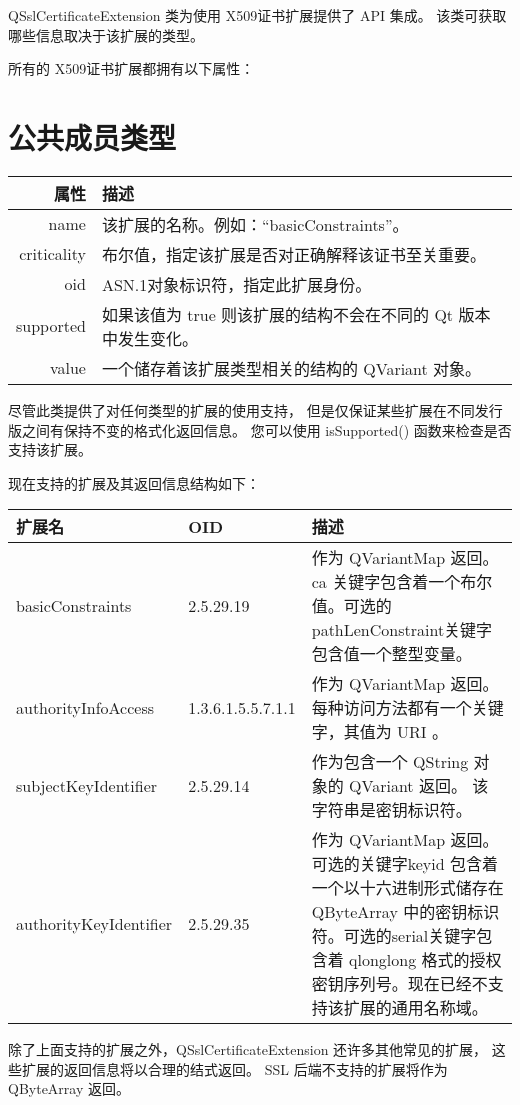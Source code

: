 QSslCertificateExtension 类为使用 
X509证书扩展提供了 API 集成。
该类可获取哪些信息取决于该扩展的类型。

所有的 X509证书扩展都拥有以下属性：

\section{公共成员类型}

\begin{tabular}{|r|l|}
\hline 
属性 &	描述 \\ 
\hline
name &	该扩展的名称。例如：“basicConstraints”。 \\ 
\hline 
criticality &	布尔值，指定该扩展是否对正确解释该证书至关重要。 \\
\hline 
oid 	&ASN.1对象标识符，指定此扩展身份。 \\ 
\hline
supported &	如果该值为 true 则该扩展的结构不会在不同的 Qt 版本中发生变化。\\
\hline
value &	一个储存着该扩展类型相关的结构的 QVariant 对象。\\
\hline
\end{tabular}


尽管此类提供了对任何类型的扩展的使用支持，
但是仅保证某些扩展在不同发行版之间有保持不变的格式化返回信息。 
您可以使用 isSupported() 函数来检查是否支持该扩展。

现在支持的扩展及其返回信息结构如下：

\begin{tabular}{|l|l|m{15em}|}
\hline 
扩展名 	&OID &	描述 \\ 
\hline
basicConstraints &	2.5.29.19 &	作为 QVariantMap 返回。ca 关键字包含着一个布尔值。可选的pathLenConstraint关键字包含值一个整型变量。 \\ 
\hline
authorityInfoAccess &	1.3.6.1.5.5.7.1.1 &	作为 QVariantMap 返回。每种访问方法都有一个关键字，其值为 URI 。 \\ 
\hline
subjectKeyIdentifier 	&2.5.29.14 	&作为包含一个 QString 对象的 QVariant 返回。 该字符串是密钥标识符。 \\ 
\hline
authorityKeyIdentifier &	2.5.29.35 &	作为 QVariantMap 返回。可选的关键字keyid 包含着一个以十六进制形式储存在 QByteArray 中的密钥标识符。可选的serial关键字包含着 qlonglong 格式的授权密钥序列号。现在已经不支持该扩展的通用名称域。 \\ 
\hline
\end{tabular}


除了上面支持的扩展之外，QSslCertificateExtension 还许多其他常见的扩展，
这些扩展的返回信息将以合理的结式返回。 
SSL 后端不支持的扩展将作为QByteArray 返回。

